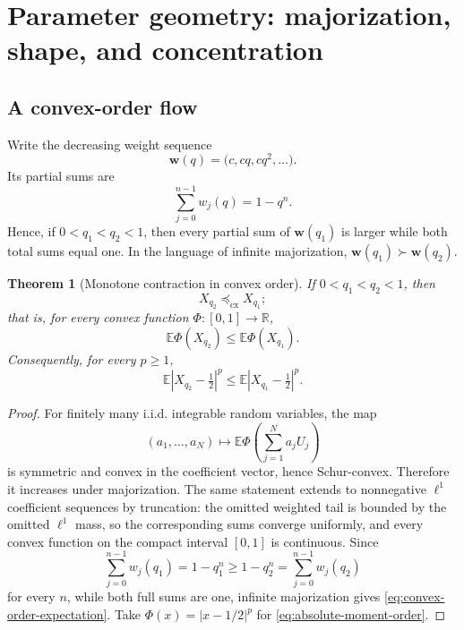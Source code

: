 \documentclass[11pt,oneside]{article}
\newtheorem{theorem}{Theorem}[section]
\theoremstyle{definition}
\theoremstyle{remark}
\newcommand{\R}{\mathbb R}
\newcommand{\E}{\mathbb E}
\newcommand{\convexorder}{\preceq_{\mathrm{cx}}}
\begin{document}
\section{Parameter geometry: majorization, shape, and concentration}
\label{sec:geometry}

\subsection{A convex-order flow}

Write the decreasing weight sequence
\[
 \bm w(q)=\bigl(c,cq,cq^2,\ldots\bigr).
\]
Its partial sums are
\[
 \sum_{j=0}^{n-1}w_j(q)=1-q^n.
\]
Hence, if $0<q_1<q_2<1$, then every partial sum of $\bm w(q_1)$ is larger while both total
sums equal one.  In the language of infinite majorization,
\(
 \bm w(q_1)\succ\bm w(q_2).
\)

\begin{theorem}[Monotone contraction in convex order]
\label{thm:convex-order}
If $0<q_1<q_2<1$, then
\begin{equation}
 X_{q_2}\convexorder X_{q_1};                               \label{eq:convex-order}
\end{equation}
that is, for every convex function $\Phi:[0,1]\to\R$,
\begin{equation}
 \E\Phi(X_{q_2})\le\E\Phi(X_{q_1}).                         \label{eq:convex-order-expectation}
\end{equation}
Consequently, for every $p\ge1$,
\begin{equation}
 \E|X_{q_2}-\tfrac12|^p
 \le \E|X_{q_1}-\tfrac12|^p.                               \label{eq:absolute-moment-order}
\end{equation}
\end{theorem}

\begin{proof}
For finitely many i.i.d. integrable random variables, the map
\[
 (a_1,\ldots,a_N)\longmapsto
 \E\Phi\!\left(\sum_{j=1}^Na_jU_j\right)
\]
is symmetric and convex in the coefficient vector, hence Schur-convex.  Therefore it
increases under majorization.  The same statement extends to nonnegative $\ell^1$ coefficient
sequences by truncation: the omitted weighted tail is bounded by the omitted $\ell^1$ mass,
so the corresponding sums converge uniformly, and every convex function on the compact
interval $[0,1]$ is continuous.  Since
\[
 \sum_{j=0}^{n-1}w_j(q_1)=1-q_1^n\ge1-q_2^n
 =\sum_{j=0}^{n-1}w_j(q_2)
\]
for every $n$, while both full sums are one, infinite majorization gives
\eqref{eq:convex-order-expectation}.  Take
$\Phi(x)=|x-1/2|^p$ for \eqref{eq:absolute-moment-order}.
\end{proof}
\end{document}
